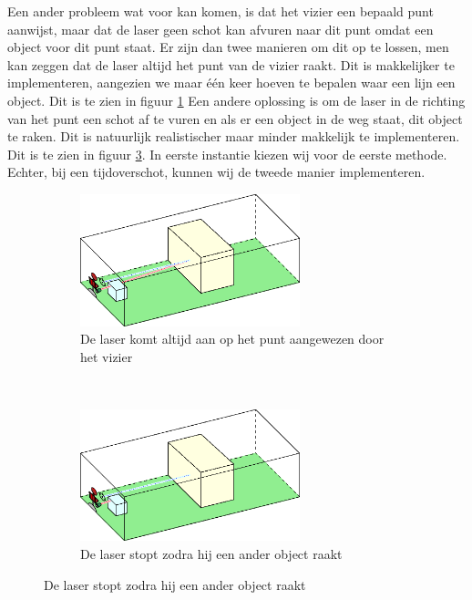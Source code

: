 \documentclass[a4paper,11pt]{article}
\begin{document}
Een ander probleem wat voor kan komen, is dat het vizier een bepaald punt aanwijst, maar dat de laser geen schot kan afvuren naar dit punt omdat een object voor dit punt staat. Er zijn dan twee manieren om dit op te lossen, men kan zeggen dat de laser altijd het punt van de vizier raakt. Dit is makkelijker te implementeren, aangezien we maar \'e\'en keer hoeven te bepalen waar een lijn een object. Dit is te zien in figuur \ref{fig:COL2} Een andere oplossing is om de laser in de richting van het punt een schot af te vuren en als er een object in de weg staat, dit object te raken. Dit is natuurlijk realistischer maar minder makkelijk te implementeren. Dit is te zien in figuur \ref{fig:COL3}. In eerste instantie kiezen wij voor de eerste methode. Echter, bij een tijdoverschot, kunnen wij de tweede manier implementeren.
\FloatBarrier
\begin{figure}[h]
\begin{subfigure}{\textwidth}
\centering
\includegraphics[width=0.7\textwidth]{Graphics/Collision2.eps}
\caption{De laser komt altijd aan op het punt aangewezen door het vizier}
\label{fig:COL2}
\end{subfigure}\\
\begin{subfigure}{\textwidth}
\centering
\includegraphics[width=0.7\textwidth]{Graphics/Collision3.eps}
\caption{De laser stopt zodra hij een ander object raakt}
\label{fig:COL3}
\end{subfigure}
\end{figure}
\end{document}
